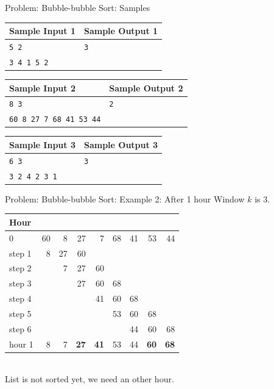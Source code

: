 \documentclass[11pt,pdf, aspectratio=169]{beamer}
\begin{document}
  \begin{frame}{Problem: Bubble-bubble Sort: Samples}
    \begin{tabular}{|l|l|}
      \hline
      \textbf{Sample Input 1} & \textbf{Sample Output 1} \\
      \hline
      \texttt{5 2}            & \texttt{3}               \\
      \texttt{3 4 1 5 2}      &                          \\
      \hline
    \end{tabular}

    \begin{tabular}{|l|l|}
      \hline
      \textbf{Sample Input 2}        & \textbf{Sample Output 2} \\
      \hline
      \texttt{8 3}                   & \texttt{2}               \\
      \texttt{60 8 27 7 68 41 53 44} &                          \\
      \hline
    \end{tabular}

    \begin{tabular}{|l|l|}
      \hline
      \textbf{Sample Input 3} & \textbf{Sample Output 3} \\
      \hline
      \texttt{6 3}            & \texttt{3}               \\
      \texttt{3 2 4 2 3 1}    &                          \\
      \hline
    \end{tabular}
  \end{frame}
  \begin{frame}{Problem: Bubble-bubble Sort: Example 2: After 1 hour}
    Window $k$ is 3.\\
    \begin{tabular}{|l|rrrrrrrr|}
      \hline
      Hour   &    &    &             &             &    &    &             &             \\
      \hline
      0      & 60 & 8  & 27          & 7           & 68 & 41 & 53          & 44          \\
      \hline
      step 1 & 8  & 27 & 60          &             &    &    &             &             \\
      step 2 &    & 7  & 27          & 60          &    &    &             &             \\
      step 3 &    &    & 27          & 60          & 68 &    &             &             \\
      step 4 &    &    &             & 41          & 60 & 68 &             &             \\
      step 5 &    &    &             &             & 53 & 60 & 68          &             \\
      step 6 &    &    &             &             &    & 44 & 60          & 68          \\
      \hline
      hour 1 & 8  & 7  & \textbf{27} & \textbf{41} & 53 & 44 & \textbf{60} & \textbf{68} \\
      \hline
    \end{tabular}\\
    List is not sorted yet, we need an other hour.
  \end{frame}
\end{document}
